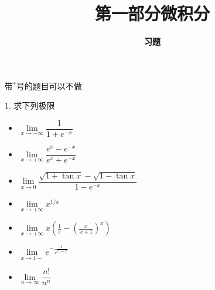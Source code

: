 \documentclass[10pt]{beamer}
\title[Calculus]{\LARGE \bfseries 第一部分\quad 微积分} %
\author[Exercises] %
{\Large \bfseries 习题}
\date{}
\begin{document}


\begin{frame}

\titlepage %

\end{frame}





\begin{frame}

{\color{red} \scriptsize 带$^*$号的题目可以不做}

\vspace{1em}

1. 求下列极限
\begin{itemize}
\item[(1)] $\lim\limits_{x\to-\infty} \dfrac{1}{1+e^{-x}}$
\item[(2)] $\lim\limits_{x\to+\infty} \dfrac{e^x-e^{-x}}{e^x+e^{-x}}$
\item[(3)] $\lim\limits_{x\to 0} \dfrac{\sqrt{1+\tan x} - \sqrt{1-\tan x}}{1-e^{-x}}$
\item[(4)] $\lim\limits_{x\to +\infty} x^{1/x}$
\item[(5)] $\lim\limits_{x\to +\infty} x\left( \frac{1}{e} - \left(\frac{x}{x+1}\right)^x \right)$
\item[(6)] $\lim\limits_{x\to 1-} e^{-\frac{1}{\sqrt{1-x}}}$
\item[(7)] $\lim\limits_{n\to \infty} \dfrac{n!}{n^n}$
\end{itemize}

\end{frame}
\end{document}
